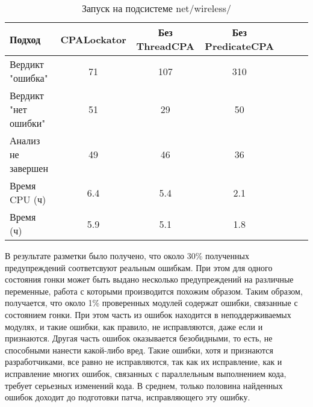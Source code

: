 \begin{center}
  \begin{table}[h]\footnotesize
    \caption{Запуск на подсистеме net/wireless/}
    \begin{tabular}{ | l | c | c | c | c | c | c |}
      \hline
      Подход         & CPALockator   & Без ThreadCPA & Без PredicateCPA \\ \hline
      Вердикт "ошибка" & 71    & 107        & 310 \\ 
      Вердикт "нет ошибки"  & 51      & 29        & 50  \\ 
      Анализ не завершен       & 49     & 46         & 36    \\ \hline
      Время CPU (ч)   & 6.4 & 5.4     & 2.1  \\ 
      Время (ч)  & 5.9 & 5.1     & 1.8   \\
      \hline
    \end{tabular}
  \end{table}
\end{center}

В результате разметки было получено, что около 30\% полученных предупреждений соответсвуют реальным ошибкам. 
При этом для одного состояния гонки может быть выдано несколько предупреждений на различные переменные, работа с которыми производится похожим образом.
Таким образом, получается, что около 1\% проверенных модулей содержат ошибки, связанные с состоянием гонки.
При этом часть из ошибок находится в неподдерживаемых модулях, и такие ошибки, как правило, не исправляются, даже если и признаются. 
Другая часть ошибок оказывается безобидными, то есть, не способными нанести какой-либо вред.
Такие ошибки, хотя и признаются разработчиками, все равно не исправляются, так как их исправление, как и исправление многих ошибок, связанных с параллельным выполнением кода, требует серьезных изменений кода.
В среднем, только половина найденных ошибок доходит до подготовки патча, исправляющего эту ошибку.

